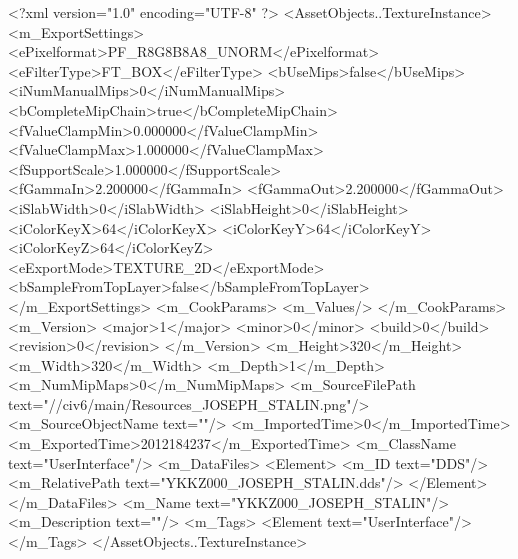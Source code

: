 <?xml version="1.0" encoding="UTF-8" ?>
<AssetObjects..TextureInstance>
	<m_ExportSettings>
		<ePixelformat>PF_R8G8B8A8_UNORM</ePixelformat>
		<eFilterType>FT_BOX</eFilterType>
		<bUseMips>false</bUseMips>
		<iNumManualMips>0</iNumManualMips>
		<bCompleteMipChain>true</bCompleteMipChain>
		<fValueClampMin>0.000000</fValueClampMin>
		<fValueClampMax>1.000000</fValueClampMax>
		<fSupportScale>1.000000</fSupportScale>
		<fGammaIn>2.200000</fGammaIn>
		<fGammaOut>2.200000</fGammaOut>
		<iSlabWidth>0</iSlabWidth>
		<iSlabHeight>0</iSlabHeight>
		<iColorKeyX>64</iColorKeyX>
		<iColorKeyY>64</iColorKeyY>
		<iColorKeyZ>64</iColorKeyZ>
		<eExportMode>TEXTURE_2D</eExportMode>
		<bSampleFromTopLayer>false</bSampleFromTopLayer>
	</m_ExportSettings>
	<m_CookParams>
		<m_Values/>
	</m_CookParams>
	<m_Version>
		<major>1</major>
		<minor>0</minor>
		<build>0</build>
		<revision>0</revision>
	</m_Version>
	<m_Height>320</m_Height>
	<m_Width>320</m_Width>
	<m_Depth>1</m_Depth>
	<m_NumMipMaps>0</m_NumMipMaps>
	<m_SourceFilePath text="//civ6/main/Resources_JOSEPH_STALIN.png"/>
	<m_SourceObjectName text=""/>
	<m_ImportedTime>0</m_ImportedTime>
	<m_ExportedTime>2012184237</m_ExportedTime>
	<m_ClassName text="UserInterface"/>
	<m_DataFiles>
		<Element>
			<m_ID text="DDS"/>
			<m_RelativePath text="YKKZ000_JOSEPH_STALIN.dds"/>
		</Element>
	</m_DataFiles>
	<m_Name text="YKKZ000_JOSEPH_STALIN"/>
	<m_Description text=""/>
	<m_Tags>
		<Element text="UserInterface"/>
	</m_Tags>
</AssetObjects..TextureInstance>

